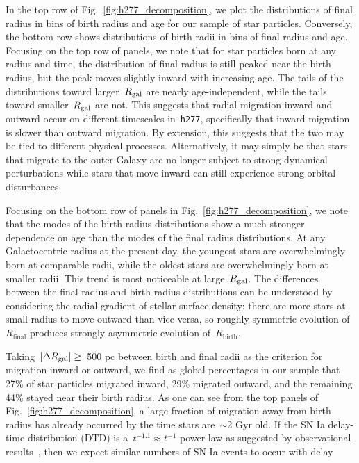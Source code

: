 \documentclass[draft2.tex]{subfiles}
\begin{document}
In the top row of Fig.~\ref{fig:h277_decomposition}, we plot the distributions 
of final radius in bins of birth radius and age for our sample of star 
particles. 
Conversely, the bottom row shows distributions of birth radii in bins of final 
radius and age. 
Focusing on the top row of panels, we note that for star particles born at any 
radius and time, the distribution of final radius is still peaked near the 
birth radius, but the peak moves slightly inward with increasing age. 
The tails of the distributions toward larger~$R_\text{gal}$ are nearly 
age-independent, while the tails toward smaller~$R_\text{gal}$ are not. 
This suggests that radial migration inward and outward occur on different 
timescales in~\texttt{h277}, specifically that inward migration is slower than 
outward migration. 
By extension, this suggests that the two may be tied to different physical 
processes. 
Alternatively, it may simply be that stars that migrate to the outer Galaxy are 
no longer subject to strong dynamical perturbations while stars that move 
inward can still experience strong orbital disturbances. 
\par 
Focusing on the bottom row of panels in Fig.~\ref{fig:h277_decomposition}, we 
note that the modes of the birth radius distributions show a much stronger 
dependence on age than the modes of the final radius distributions. 
At any Galactocentric radius at the present day, the youngest stars are 
overwhelmingly born at comparable radii, while the oldest stars are 
overwhelmingly born at smaller radii. 
This trend is most noticeable at large~$R_\text{gal}$. 
The differences between the final radius and birth radius distributions can be 
understood by considering the radial gradient of stellar surface density: there 
are more stars at small radius to move outward than vice versa, so roughly 
symmetric evolution of~$R_\text{final}$ produces strongly asymmetric evolution 
of~$R_\text{birth}$. 
\par 
Taking~$\left|\Delta R_\text{gal}\right| \geq$~500 pc 
between birth and final radii as the criterion for migration inward or outward, 
we find as global percentages in our sample that 27\% of star particles 
migrated inward, 29\% migrated outward, and the remaining 44\% stayed near 
their birth radius. 
As one can see from the top panels of Fig.~\ref{fig:h277_decomposition}, a 
large fraction of migration away from birth radius has already occurred by the 
time stars are~$\sim$2 Gyr old. 
If the SN Ia delay-time distribution (DTD) is a~$t^{-1.1} \approx t^{-1}$ 
power-law as suggested by observational results~\citep[e.g.][]{Maoz2012, 
Maoz2017}, then we expect similar numbers of SN Ia events to occur with delay 
\end{document}
